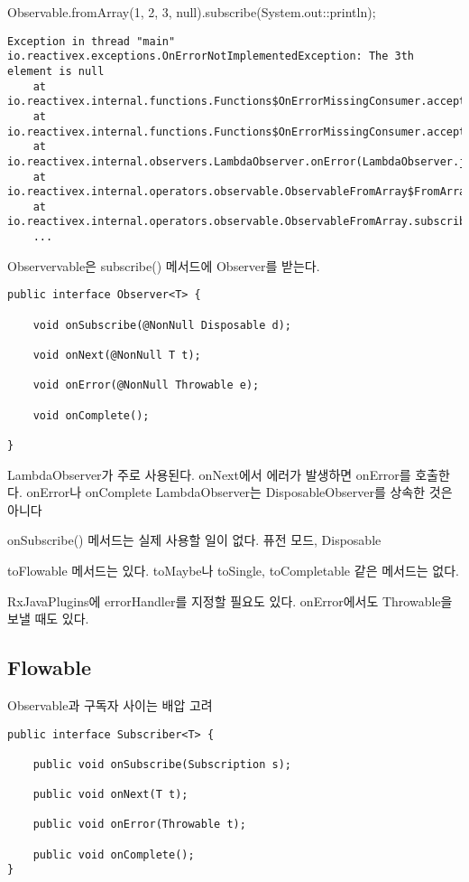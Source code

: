 \documentclass{book}
\begin{document}

Observable.fromArray(1, 2, 3, null).subscribe(System.out::println);
\begin{verbatim}
Exception in thread "main" io.reactivex.exceptions.OnErrorNotImplementedException: The 3th element is null
	at io.reactivex.internal.functions.Functions$OnErrorMissingConsumer.accept(Functions.java:704)
	at io.reactivex.internal.functions.Functions$OnErrorMissingConsumer.accept(Functions.java:701)
	at io.reactivex.internal.observers.LambdaObserver.onError(LambdaObserver.java:74)
	at io.reactivex.internal.operators.observable.ObservableFromArray$FromArrayDisposable.run(ObservableFromArray.java:104)
	at io.reactivex.internal.operators.observable.ObservableFromArray.subscribeActual(ObservableFromArray.java:36)
	...
\end{verbatim}




Observervable은 subscribe() 메서드에 Observer를 받는다.

\begin{verbatim}
public interface Observer<T> {

    void onSubscribe(@NonNull Disposable d);

    void onNext(@NonNull T t);

    void onError(@NonNull Throwable e);

    void onComplete();

}
\end{verbatim}

LambdaObserver가 주로 사용된다.
onNext에서 에러가 발생하면 onError를 호출한다.
onError나 onComplete
LambdaObserver는 DisposableObserver를 상속한 것은 아니다

onSubscribe() 메서드는 실제 사용할 일이 없다.
퓨전 모드, Disposable

toFlowable 메서드는 있다.
toMaybe나 toSingle, toCompletable 같은 메서드는 없다.

RxJavaPlugins에 errorHandler를 지정할 필요도 있다. onError에서도 Throwable을 보낼 때도 있다.

\subsection{Flowable}
Observable과 구독자 사이는 배압 고려

\begin{verbatim}
public interface Subscriber<T> {

    public void onSubscribe(Subscription s);

    public void onNext(T t);

    public void onError(Throwable t);

    public void onComplete();
} 
\end{verbatim}
\end{document}
